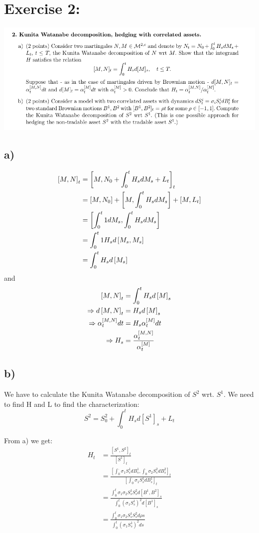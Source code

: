 \documentclass[document.tex]{subfiles}
\begin{document}
\section*{Exercise 2:}


\includegraphics[width=\textwidth]{ex2.png}
\subsection*{a)}
\begin{align*}
	\left[M , N \right]_t &= \left[M , N_0 + \int_0^t H_s dM_s + L_t \right]_t\\
	&= \left[M , N_0 \right] + \left[M , \int_0^t H_s dM_s \right] + \left[M , L_t \right]\\
	&= \left[\int_0^t 1 dM_s , \int_0^t H_s dM_s \right]\\
	&= \int_0^t 1 H_s d \left[M_s , M_s \right]\\
	&= \int_0^t H_s d \left[ M_s \right]
\end{align*}
and \\
\begin{align*}
	\left[M , N \right]_t &= \int_0^t H_s d \left[ M \right]_s \\
	\Rightarrow	d \left[M , N \right]_t &= H_s d \left[ M \right]_s \\
	\Rightarrow	\alpha_t^{\left[M , N \right]} dt &= H_s \alpha_t^{\left[ M \right]} dt \\
	\Rightarrow H_s &= \frac{\alpha_t^{\left[M , N \right]}}{\alpha_t^{\left[ M \right]}}
\end{align*}

\subsection*{b)} 
We have to calculate the Kunita Watanabe decomposition of $S^2$ wrt. $S^1$. We need to find H and L to find the characterization:
\begin{equation}
S^2 = S_0^2 + \int_0^t H_s d[S^1]_s + L_t
\end{equation}

From a) we get:
\begin{align*}
H_t &= \frac{[S^1, S^2]_t}{[S^1]_t} \\
	&= \frac{[\int_0^. \sigma_1 S_s^1 d B^1_s, \int_0^. \sigma_2 S_s^2 d B^2_s]_t}{[\int_0^. \sigma_1 S_s^1 d B^1_s]_t} \\
&=  \frac{\int_0^t \sigma_1 \sigma_2 S_s^1 S_s^2 d [B^1, B^2]_s}{\int_0^t (\sigma_1 S_s^1)^2 d [B^1]_s}\\ 
&= \frac{\int_0^t \sigma_1 \sigma_2 S_s^1 S_s^2 d \rho s}{\int_0^t (\sigma_1 S_s^1)^2 d s} 
\end{align*}
\end{document}
